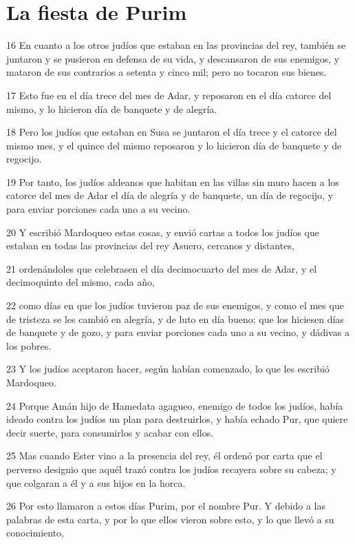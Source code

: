 \section*{La fiesta de Purim}

\par 16 En cuanto a los otros judíos que estaban en las provincias del rey, también se juntaron y se pusieron en defensa de su vida, y descansaron de sus enemigos, y mataron de sus contrarios a setenta y cinco mil; pero no tocaron sus bienes.
\par 17 Esto fue en el día trece del mes de Adar, y reposaron en el día catorce del mismo, y lo hicieron día de banquete y de alegría.
\par 18 Pero los judíos que estaban en Susa se juntaron el día trece y el catorce del mismo mes, y el quince del mismo reposaron y lo hicieron día de banquete y de regocijo.
\par 19 Por tanto, los judíos aldeanos que habitan en las villas sin muro hacen a los catorce del mes de Adar el día de alegría y de banquete, un día de regocijo, y para enviar porciones cada uno a su vecino.
\par 20 Y escribió Mardoqueo estas cosas, y envió cartas a todos los judíos que estaban en todas las provincias del rey Asuero, cercanos y distantes,
\par 21 ordenándoles que celebrasen el día decimocuarto del mes de Adar, y el decimoquinto del mismo, cada año,
\par 22 como días en que los judíos tuvieron paz de sus enemigos, y como el mes que de tristeza se les cambió en alegría, y de luto en día bueno; que los hiciesen días de banquete y de gozo, y para enviar porciones cada uno a su vecino, y dádivas a los pobres.
\par 23 Y los judíos aceptaron hacer, según habían comenzado, lo que les escribió Mardoqueo.
\par 24 Porque Amán hijo de Hamedata agagueo, enemigo de todos los judíos, había ideado contra los judíos un plan para destruirlos, y había echado Pur, que quiere decir suerte, para consumirlos y acabar con ellos.
\par 25 Mas cuando Ester vino a la presencia del rey, él ordenó por carta que el perverso designio que aquél trazó contra los judíos recayera sobre su cabeza; y que colgaran a él y a sus hijos en la horca.
\par 26 Por esto llamaron a estos días Purim, por el nombre Pur. Y debido a las palabras de esta carta, y por lo que ellos vieron sobre esto, y lo que llevó a su conocimiento,
